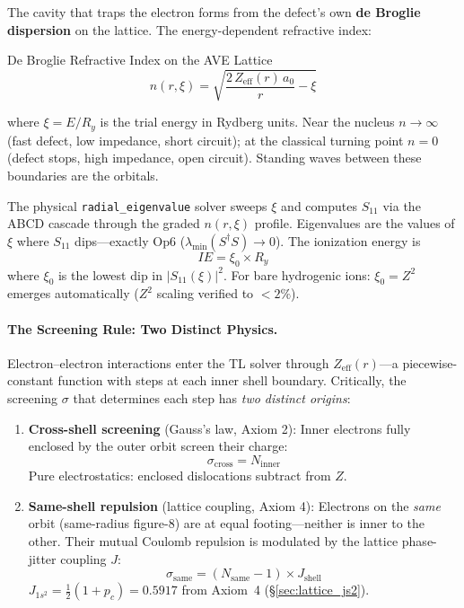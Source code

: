 The cavity that traps the electron forms from the defect's own
\textbf{de Broglie dispersion} on the lattice.
The energy-dependent refractive index:
\begin{resultbox}{De Broglie Refractive Index on the AVE Lattice}
\begin{equation}
    n(r, \xi) = \sqrt{\frac{2\,Z_{\text{eff}}(r)\,a_0}{r} - \xi}
    \label{eq:de_broglie_n}
\end{equation}
\end{resultbox}
where $\xi = E/R_y$ is the trial energy in Rydberg units.
Near the nucleus $n \to \infty$ (fast defect, low impedance, short circuit);
at the classical turning point $n = 0$ (defect stops, high impedance, open circuit).
Standing waves between these boundaries are the orbitals.

The physical \texttt{radial\_eigenvalue} solver sweeps $\xi$ and
computes $S_{11}$ via the ABCD cascade through the graded $n(r,\xi)$ profile.
Eigenvalues are the values of $\xi$ where $S_{11}$ dips---exactly Op6 ($\lambda_{\min}(S^\dagger S) \to 0$).
The ionization energy is
\begin{equation}
    IE = \xi_0 \times R_y
    \label{eq:ie_from_tl}
\end{equation}
where $\xi_0$ is the lowest dip in $|S_{11}(\xi)|^2$.
For bare hydrogenic ions: $\xi_0 = Z^2$ emerges automatically ($Z^2$ scaling verified to $< 2\%$).

\paragraph{The Screening Rule: Two Distinct Physics.}
Electron--electron interactions enter the TL solver through $Z_{\text{eff}}(r)$---a
piecewise-constant function with steps at each inner shell boundary.
Critically, the screening $\sigma$ that determines each step has \emph{two distinct origins}:

\begin{enumerate}
    \item \textbf{Cross-shell screening} (Gauss's law, Axiom 2):
    Inner electrons fully enclosed by the outer orbit screen their charge:
    \begin{equation}
        \sigma_{\text{cross}} = N_{\text{inner}}
    \end{equation}
    Pure electrostatics: enclosed dislocations subtract from $Z$.

    \item \textbf{Same-shell repulsion} (lattice coupling, Axiom 4):
    Electrons on the \emph{same} orbit (same-radius figure-8) are at equal footing---neither
    is inner to the other.  Their mutual Coulomb repulsion is modulated by the lattice
    phase-jitter coupling $J$:
    \begin{equation}
        \sigma_{\text{same}} = (N_{\text{same}} - 1) \times J_{\text{shell}}
    \end{equation}
    $J_{1s^2} = \tfrac{1}{2}(1 + p_c) = 0.5917$ from Axiom~4 (§\ref{sec:lattice_js2}).
\end{enumerate}

